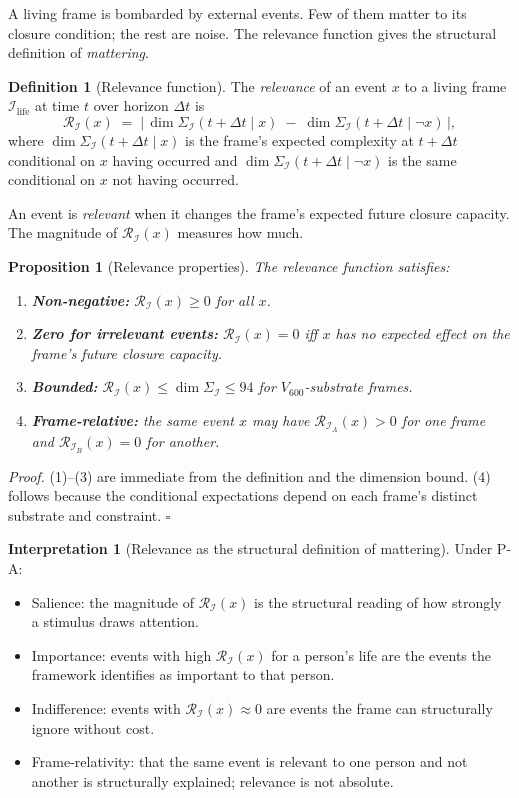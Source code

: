 \documentclass[11pt]{article}
\theoremstyle{plain}
\newtheorem{proposition}[theorem]{Proposition}
\theoremstyle{definition}
\newtheorem{definition}[theorem]{Definition}
\newtheorem{interpretation}[theorem]{Interpretation}
\theoremstyle{remark}
\newcommand{\Ical}{\mathcal{I}}
\newcommand{\Rcal}{\mathcal{R}}
\newcommand{\Ilife}{\Ical_{\mathrm{life}}}
\begin{document}
A living frame is bombarded by external events. Few of them matter to its closure condition; the rest are noise. The relevance function gives the structural definition of \emph{mattering}.

\begin{definition}[Relevance function]\label{def:relevance}
The \emph{relevance} of an event $x$ to a living frame $\Ilife$ at time $t$ over horizon $\Delta t$ is
\[
  \Rcal_\Ical(x) \;=\; \big|\, \dim \Sigma_\Ical(t + \Delta t \mid x) \;-\; \dim \Sigma_\Ical(t + \Delta t \mid \neg x) \,\big|,
\]
where $\dim \Sigma_\Ical(t + \Delta t \mid x)$ is the frame's expected complexity at $t + \Delta t$ conditional on $x$ having occurred and $\dim \Sigma_\Ical(t + \Delta t \mid \neg x)$ is the same conditional on $x$ not having occurred.
\end{definition}

An event is \emph{relevant} when it changes the frame's expected future closure capacity. The magnitude of $\Rcal_\Ical(x)$ measures how much.

\begin{proposition}[Relevance properties]\label{prop:relevance-properties}
The relevance function satisfies:
\begin{enumerate}[leftmargin=2em]
\item \textbf{Non-negative:} $\Rcal_\Ical(x) \geq 0$ for all $x$.
\item \textbf{Zero for irrelevant events:} $\Rcal_\Ical(x) = 0$ iff $x$ has no expected effect on the frame's future closure capacity.
\item \textbf{Bounded:} $\Rcal_\Ical(x) \leq \dim \Sigma_\Ical \leq 94$ for $V_{600}$-substrate frames.
\item \textbf{Frame-relative:} the same event $x$ may have $\Rcal_{\Ical_A}(x) > 0$ for one frame and $\Rcal_{\Ical_B}(x) = 0$ for another.
\end{enumerate}
\end{proposition}

\noindent\emph{Proof.} (1)--(3) are immediate from the definition and the dimension bound. (4) follows because the conditional expectations depend on each frame's distinct substrate and constraint. \hfill$\square$

\begin{interpretation}[Relevance as the structural definition of mattering]\label{int:relevance}
Under P-A:
\begin{itemize}[leftmargin=2em]
\item Salience: the magnitude of $\Rcal_\Ical(x)$ is the structural reading of how strongly a stimulus draws attention.
\item Importance: events with high $\Rcal_\Ical(x)$ for a person's life are the events the framework identifies as important to that person.
\item Indifference: events with $\Rcal_\Ical(x) \approx 0$ are events the frame can structurally ignore without cost.
\item Frame-relativity: that the same event is relevant to one person and not another is structurally explained; relevance is not absolute.
\end{itemize}
\end{interpretation}
\end{document}
